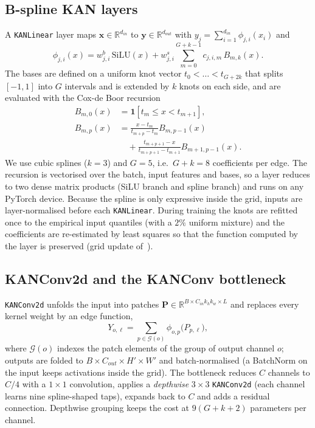 \documentclass[conference]{IEEEtran}
\begin{document}
\subsection{B-spline KAN layers}
A \texttt{KANLinear} layer maps $\mathbf{x}\in\mathbb{R}^{d_{in}}$ to $\mathbf{y}\in\mathbb{R}^{d_{out}}$ with $y_j=\sum_{i=1}^{d_{in}}\phi_{j,i}(x_i)$ and
\begin{equation}
\phi_{j,i}(x)=w^{b}_{j,i}\,\mathrm{SiLU}(x)+w^{s}_{j,i}\sum_{m=0}^{G+k-1}c_{j,i,m}\,B_{m,k}(x).
\label{eq:kan}
\end{equation}
The bases are defined on a uniform knot vector $t_0<\dots<t_{G+2k}$ that splits $[-1,1]$ into $G$ intervals and is extended by $k$ knots on each side, and are evaluated with the Cox-de Boor recursion~\cite{deboor1978splines}
\begin{align}
B_{m,0}(x)&=\mathbf{1}[t_m\le x<t_{m+1}],\\
B_{m,p}(x)&=\tfrac{x-t_m}{t_{m+p}-t_m}B_{m,p-1}(x)\nonumber\\
&\quad+\tfrac{t_{m+p+1}-x}{t_{m+p+1}-t_{m+1}}B_{m+1,p-1}(x).
\end{align}
We use cubic splines ($k{=}3$) and $G{=}5$, i.e.\ $G+k=8$ coefficients per edge. The recursion is vectorised over the batch, input features and bases, so a layer reduces to two dense matrix products (SiLU branch and spline branch) and runs on any PyTorch device. Because the spline is only expressive inside the grid, inputs are layer-normalised before each \texttt{KANLinear}. During training the knots are refitted once to the empirical input quantiles (with a $2\%$ uniform mixture) and the coefficients are re-estimated by least squares so that the function computed by the layer is preserved (grid update of~\cite{liu2025kan}).

\subsection{KANConv2d and the KANConv bottleneck}
\texttt{KANConv2d} unfolds the input into patches $\mathbf{P}\in\mathbb{R}^{B\times C_{in}k_hk_w\times L}$ and replaces every kernel weight by an edge function,
\begin{equation}
Y_{o,\ell}=\sum_{p\in\mathcal{G}(o)}\phi_{o,p}\big(P_{p,\ell}\big),
\end{equation}
where $\mathcal{G}(o)$ indexes the patch elements of the group of output channel $o$; outputs are folded to $B\times C_{out}\times H'\times W'$ and batch-normalised (a BatchNorm on the input keeps activations inside the grid). The bottleneck reduces $C$ channels to $C/4$ with a $1{\times}1$ convolution, applies a \emph{depthwise} $3{\times}3$ \texttt{KANConv2d} (each channel learns nine spline-shaped taps), expands back to $C$ and adds a residual connection. Depthwise grouping keeps the cost at $9(G{+}k{+}2)$ parameters per channel.
\end{document}
